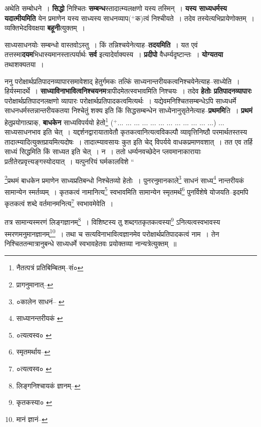 \documentclass[article,12pt,a4paper]{memoir}
\newcommand{\add}[1]{($^{+}$#1)}
\begin{document}
	  \pstart अथेति सम्बोधने । \textbf{सिद्धो} निश्चितः \textbf{सम्बन्ध}स्तादात्म्यलक्षणो यस्य तस्मिन् । \textbf{यस्य साध्यधर्मस्य यदात्मीयमिति} येन प्रमाणेन यस्य साध्यस्य साधनव्याप\add{क}त्वं निश्चीयते । तदेव तस्येत्यभिप्रायेणोक्तम् । व्यक्तिभेदविवक्षया \textbf{बहूनी}त्युक्तम् ।
	\pend
      

	  \pstart साध्यसाधनयोः सम्बन्धो वास्तवोऽस्तु । किं तन्निश्चयेनेत्याह--\textbf{तदयमिति} । यत एवं तत्तस्मा\textbf{दयम}भिधास्यमानस्तात्पर्यार्थः \textbf{सर्व} इत्यादेर्वाक्यस्य । \textbf{प्रदीपो} वैधर्म्यदृष्टान्तः । \textbf{योग्यतया} तथाशक्यतया ।
	\pend
      

	  \pstart ननु परोक्षार्थप्रतिपादनव्यापारसमावेशाद् हेतुर्गमकः तत्किं साध्यनान्तरीयकत्वनिश्चयेनेत्याह--साध्येति । हिर्यस्मादर्थे । \textbf{साध्याविनाभावित्वनिश्चयनम}त्रापीदमेतत्स्वभावमिति निश्चयः । तदेव \textbf{हेतोः प्रतिपादनव्यापारः} परोक्षार्थप्रतिपादनलक्षणो व्यापारः परोक्षार्थप्रतिपादकत्वमित्यर्थः । यद्येवमनिश्चितसम्बन्धेऽपि साध्यधर्मे साधनधर्मस्तन्नान्तरीयकतया निश्चेतुं शक्य इति किं सिद्धसम्बन्धेन साध्येनानुसृतेनेत्याह--\textbf{प्रथममि}ति । \textbf{प्रथमं} हेतुप्रयोगात्प्राक्, \textbf{बाधकेन} साध्यविपर्ययो हेतो\leavevmode{}\footnote{नैतत्पत्रं प्रतिबिम्बितम्--सं०} \add{... ... ... ... ... ... ... ... ... ... ... ...} ...\leavevmode{} साध्यसाधनभाव इति चेत् । यद्दर्शनद्वारायातावेतौ कृतकत्वानित्यत्वविकल्पौ व्यावृत्तिनिष्ठौ परमार्थतस्तस्य तादात्म्यादित्युक्तप्रायमित्यदोषः । तादात्म्यावसायः कुत इति चेद् विपर्यये वाधकप्रमाणवशात् । तत एव तर्हि साध्यं सिद्धमिति किं साध्यत इति चेत् । न । ततो धर्म्यनवच्छेदेन प्लवमानाकारायाः प्रतीतेरप्रवृत्त्यङ्गस्योदयात् । यत्पुनरियं घर्मकालविशे  \leavevmode{} “
	  
	\footnote{प्रागनुमानात्--\cite{dp-msD-n}}प्रथमं बाधकेन प्रमाणेन साध्यप्रतिबन्धो निश्चेतव्यो हेतोः । पुनरनुमानकाले\footnote{०कालेन साधनं--\cite{dp-msA} \cite{dp-msB} \cite{dp-edP} \cite{dp-edH} \cite{dp-edE}} साधनं साध्य\footnote{साध्यानन्तरीयकं \cite{dp-msA} \cite{dp-msB} \cite{dp-edP} \cite{dp-edH} \cite{dp-edE}} नान्तरीयकं सामान्येन स्मर्तव्यम् । कृतकत्वं नामानित्य\footnote{०त्यत्वस्व० \cite{dp-msA} \cite{dp-msB} \cite{dp-edP} \cite{dp-edH} \cite{dp-edE} \cite{dp-edN}} स्वभावमिति सामान्येन स्मृतमर्थ\footnote{स्मृतमर्थाय--\cite{dp-msB}} पुनर्विशेषे योजयति--इदमपि कृतकत्वं शब्दे वर्तमानमनित्य\footnote{०त्यत्वस्व० \cite{dp-msC}} स्वभावमेवेति । 
	  
	तत्र सामान्यस्मरणं लिङ्गज्ञानम्\footnote{लिङ्गनिश्चायकं ज्ञानम्--\cite{dp-msD-n}} । विशिष्टस्य तु शब्दगतकृतकत्वस्या\footnote{कृतकस्या० \cite{dp-edH}} ऽनित्यत्वस्वभावस्य स्मरणमनुमानज्ञानम्\footnote{मानं ज्ञानं--\cite{dp-msC}} । तथा च सत्यविनाभावित्वज्ञानमेव परोक्षार्थप्रतिपादकत्वं नाम । तेन निश्चिततन्मात्रानुबन्धे साध्यधर्मे स्वभावहेतवः प्रयोक्तव्या नान्यत्रेत्युक्तम् ॥ 
	  
\end{document}
